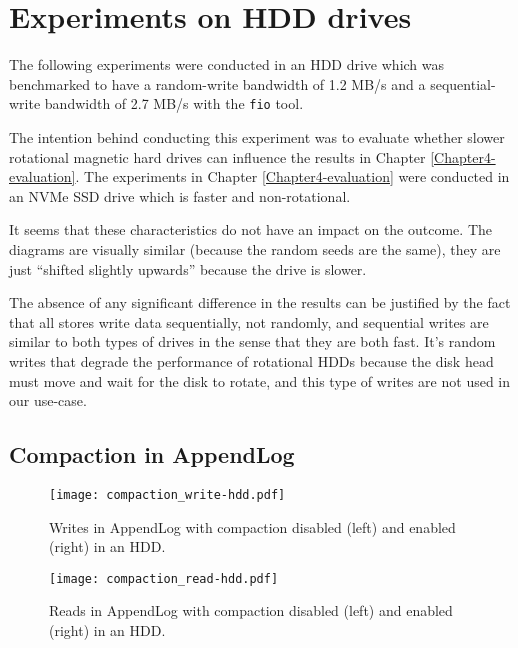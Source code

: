 

\chapter{Experiments on HDD drives} %
\label{Appendix-B} %

The following experiments were conducted in an HDD drive which was benchmarked to have a random-write bandwidth of 1.2 MB/s and a sequential-write bandwidth of 2.7 MB/s with the \verb|fio| tool.

The intention behind conducting this experiment was to evaluate whether slower rotational magnetic hard drives can influence the results in Chapter \ref{Chapter4-evaluation}. The experiments in Chapter \ref{Chapter4-evaluation} were conducted in an NVMe SSD drive which is faster and non-rotational.

It seems that these characteristics do not have an impact on the outcome. The diagrams are visually similar (because the random seeds are the same), they are just ``shifted slightly upwards'' because the drive is slower.

The absence of any significant difference in the results can be justified by the fact that all stores write data sequentially, not randomly, and sequential writes are similar to both types of drives in the sense that they are both fast. It's random writes that degrade the performance of rotational HDDs because the disk head must move and wait for the disk to rotate, and this type of writes are not used in our use-case.

\section{Compaction in AppendLog}

\begin{figure}[h]
    \centering
    \texttt{[image: compaction\_write-hdd.pdf]}
    \caption{Writes in AppendLog with compaction disabled (left) and enabled (right) in an HDD.}
    \label{fig:compaction-write-hdd}
\end{figure}

\begin{figure}[h]
    \centering
    \texttt{[image: compaction\_read-hdd.pdf]}
    \caption{Reads in AppendLog with compaction disabled (left) and enabled (right) in an HDD.}
    \label{fig:compaction-read-hdd}
\end{figure}

